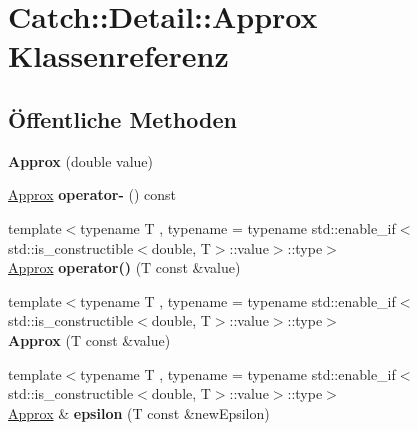 \hypertarget{classCatch_1_1Detail_1_1Approx}{}\section{Catch\+:\+:Detail\+:\+:Approx Klassenreferenz}
\label{classCatch_1_1Detail_1_1Approx}
\subsection*{Öffentliche Methoden}
\begin{DoxyCompactItemize}
\item 
\mbox{\label{classCatch_1_1Detail_1_1Approx_a1a8618ea8db08c66bd3d9fe8f74b957a}} 
{\bfseries Approx} (double value)
\item 
\mbox{\label{classCatch_1_1Detail_1_1Approx_aa9adf5f05e641df770039543d5067d30}} 
\hyperlink{classCatch_1_1Detail_1_1Approx}{Approx} {\bfseries operator-\/} () const
\item 
\mbox{\label{classCatch_1_1Detail_1_1Approx_ad8b2757f4804f9a1d3fa674efb98c20e}} 
{\footnotesize template$<$typename T , typename  = typename std\+::enable\+\_\+if$<$std\+::is\+\_\+constructible$<$double, T$>$\+::value$>$\+::type$>$ }\\\hyperlink{classCatch_1_1Detail_1_1Approx}{Approx} {\bfseries operator()} (T const \&value)
\item 
\mbox{\label{classCatch_1_1Detail_1_1Approx_ab14b979fa8a37f21d037157fabed4072}} 
{\footnotesize template$<$typename T , typename  = typename std\+::enable\+\_\+if$<$std\+::is\+\_\+constructible$<$double, T$>$\+::value$>$\+::type$>$ }\\{\bfseries Approx} (T const \&value)
\item 
\mbox{\label{classCatch_1_1Detail_1_1Approx_acd26adba86a066b9f40dad467f23bc85}} 
{\footnotesize template$<$typename T , typename  = typename std\+::enable\+\_\+if$<$std\+::is\+\_\+constructible$<$double, T$>$\+::value$>$\+::type$>$ }\\\hyperlink{classCatch_1_1Detail_1_1Approx}{Approx} \& {\bfseries epsilon} (T const \&new\+Epsilon)
\item 

\end{DoxyCompactItemize}
